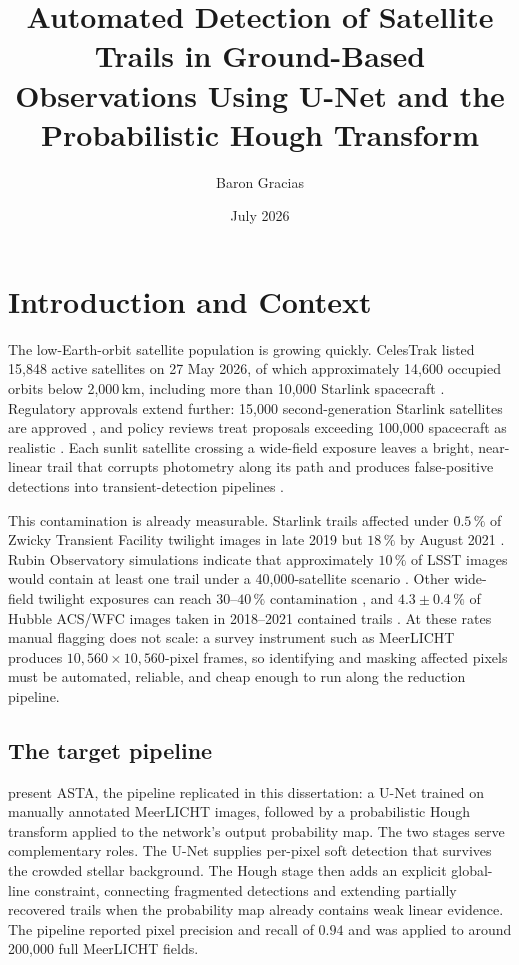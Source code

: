 \documentclass{cam-thesis}
\title{Automated Detection of Satellite Trails in Ground-Based Observations
       Using U-Net and the Probabilistic Hough Transform}
\author{Baron Gracias}
\date{July 2026}
\begin{document}
\frontmatter{}

\chapter{Introduction and Context}
\label{ch:introduction}

The low-Earth-orbit satellite population is growing quickly. CelesTrak listed
15{,}848 active satellites on 27 May 2026, of which approximately 14{,}600
occupied orbits below 2{,}000\,km, including more than 10{,}000 Starlink
spacecraft \citep{celestrak2026}. Regulatory approvals extend further:
15{,}000 second-generation Starlink satellites are approved \citep{fcc2026}, and
policy reviews treat proposals exceeding 100{,}000 spacecraft as realistic
\citep{walker2020,walker2021}. Each sunlit satellite crossing a wide-field
exposure leaves a bright, near-linear trail that corrupts photometry
along its path and produces false-positive detections into
transient-detection pipelines \citep{tyson2020,hainaut2020}.

This contamination is already measurable. Starlink trails affected under
$0.5\,\%$ of Zwicky Transient Facility twilight images in late 2019 but
$18\,\%$ by August 2021 \citep{mroz2022}. Rubin Observatory simulations
indicate that approximately $10\,\%$ of LSST images would contain at least one
trail under a 40{,}000-satellite scenario \citep{rubin2026}. Other wide-field
twilight exposures can reach $30$--$40\,\%$ contamination
\citep{hainaut2020,bassa2022}, and $4.3\pm0.4\,\%$ of Hubble ACS/WFC images
taken in 2018--2021 contained trails \citep{kruk2023}. At these
rates manual flagging does not scale: a survey instrument such as MeerLICHT
\citep{bloemen2016} produces $10{,}560\times10{,}560$-pixel frames,
so identifying and masking affected pixels must be automated,
reliable, and cheap enough to run along the reduction pipeline.

\section{The target pipeline}
\label{sec:target_pipeline}

\citet{stoppa2024} present ASTA, the pipeline replicated in this
dissertation: a U-Net \citep{ronneberger2015} trained on manually annotated
MeerLICHT images, followed by a probabilistic Hough transform
\citep{hough1962,matas2000} applied to the network's output probability map.
The two stages serve complementary roles. The U-Net supplies per-pixel soft
detection that survives the crowded stellar background. The Hough stage then
adds an explicit global-line constraint, connecting fragmented detections and
extending partially recovered trails when the probability map already contains
weak linear evidence. The pipeline reported pixel precision and
recall of $0.94$ and was applied to around 200{,}000 full MeerLICHT fields.
\end{document}
